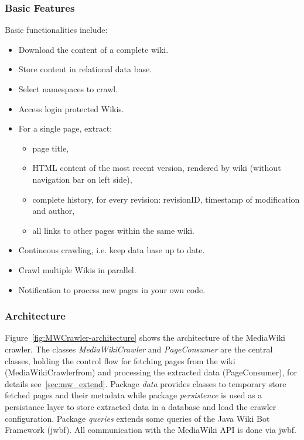 \subsubsection{Basic Features}
Basic functionalities include:
\begin{itemize}
\item Download the content of a complete wiki.
\item Store content in relational data base.
\item Select namespaces to crawl.
\item Access login protected Wikis.
\item For a single page, extract: 
	\begin{itemize}
	\item page title,
	\item HTML content of the most recent version, rendered by wiki (without navigation bar on left side),
	\item complete history, for every revision: revisionID, timestamp of modification and author,
	\item all links to other pages within the same wiki.
	\end{itemize}	
\item Contineous crawling, i.e. keep data base up to date.
\item Crawl multiple Wikis in parallel.
\item Notification to process new pages in your own code.
\end{itemize}

\subsubsection{Architecture}

Figure~\ref{fig:MWCrawler-architecture} shows the architecture of the MediaWiki crawler. The classes \emph{MediaWikiCrawler} and \emph{PageConsumer} are the central classes, holding the control flow for fetching pages from the wiki (MediaWikiCrawlerfrom) and processing the extracted data (PageConsumer), for details see~\ref{sec:mw_extend}. Package \emph{data} provides classes to temporary store fetched pages and their metadata while package \emph{persistence} is used as a persistance layer to store extracted data in a database and load the crawler configuration. Package \emph{queries} extends some queries of the Java Wiki Bot Framework (jwbf). All communication with the MediaWiki API is done via jwbf. 

